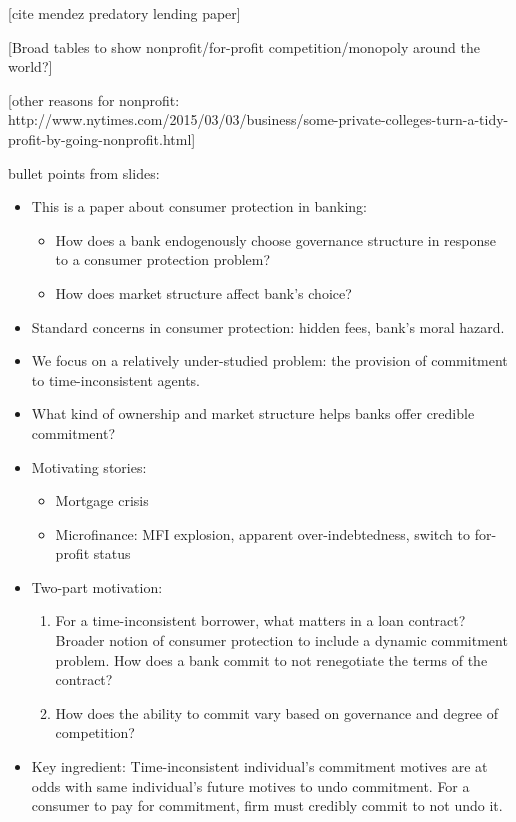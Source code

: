 \documentclass[11pt]{article}%
\begin{document}
[cite mendez predatory lending paper]

[Broad tables to show nonprofit/for-profit competition/monopoly around the world?]

[other reasons for nonprofit: http://www.nytimes.com/2015/03/03/business/some-private-colleges-turn-a-tidy-profit-by-going-nonprofit.html]

\bigskip

bullet points from slides:

\begin{itemize}
\item This is a paper about consumer protection in banking:

\begin{itemize}
\item How does a bank endogenously choose governance structure in response to
a consumer protection problem?

\item How does market structure affect bank's choice?
\end{itemize}

\item Standard concerns in consumer protection: hidden fees, bank's moral hazard.

\item We focus on a relatively under-studied problem: the provision of
commitment to time-inconsistent agents.

\item What kind of ownership and market structure helps banks offer credible commitment?

\item Motivating stories:

\begin{itemize}
\item Mortgage crisis

\item Microfinance: MFI explosion, apparent over-indebtedness, switch to
for-profit status
\end{itemize}

\item Two-part motivation:

\begin{enumerate}
\item For a time-inconsistent borrower, what matters in a loan contract?
Broader notion of consumer protection to include a dynamic commitment problem.
How does a bank commit to not renegotiate the terms of the contract?

\item How does the ability to commit vary based on governance and degree of competition?
\end{enumerate}

\item Key ingredient: Time-inconsistent individual's commitment motives are at
odds with same individual's future motives to undo commitment. For a consumer
to pay for commitment, firm must credibly commit to not undo it.
\end{itemize}
\end{document}
